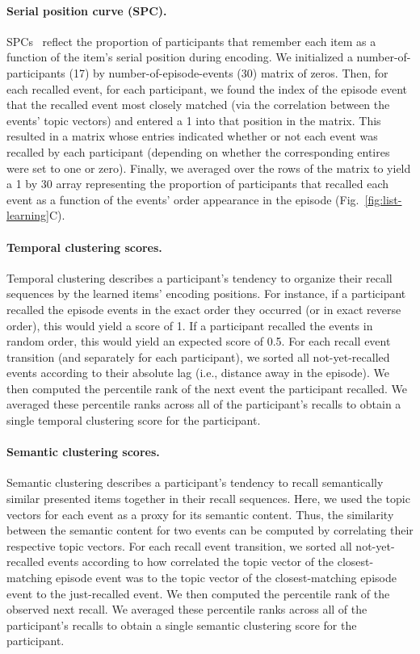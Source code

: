 \documentclass[10pt]{article}
\begin{document}
\paragraph{Serial position curve (SPC).} SPCs~\citep{Murd62a} reflect the proportion of participants that remember each item as a function of the item's serial position during encoding. We initialized a number-of-participants (17) by number-of-episode-events (30) matrix of zeros. Then, for each recalled event, for each participant, we found the index of the episode event that the recalled event most closely matched (via the correlation between the events' topic vectors) and entered a 1 into that position in the matrix. This resulted in a matrix whose entries indicated whether or not each event was recalled by each participant (depending on whether the corresponding entires were set to one or zero).  Finally, we averaged over the rows of the matrix to yield a 1 by 30 array representing the proportion of participants that recalled each event as a function of the events' order appearance in the episode (Fig.~\ref{fig:list-learning}C).

\paragraph{Temporal clustering scores.} Temporal clustering describes a participant's tendency to organize their recall sequences by the learned items' encoding positions.  For instance, if a participant recalled the episode events in the exact order they occurred (or in exact reverse order), this would yield a score of 1.  If a participant recalled the events in random order, this would yield an expected score of 0.5.  For each recall event transition (and separately for each participant), we sorted all not-yet-recalled events according to their absolute lag (i.e., distance away in the episode).  We then computed the percentile rank of the next event the participant recalled.  We averaged these percentile ranks across all of the participant's recalls to obtain a single temporal clustering score for the participant.

\paragraph{Semantic clustering scores.} Semantic clustering describes a participant's tendency to recall semantically similar presented items together in their recall sequences.  Here, we used the topic vectors for each event as a proxy for its semantic content. Thus, the similarity between the semantic content for two events can be computed by correlating their respective topic vectors.  For each recall event transition, we sorted all not-yet-recalled events according to how correlated the topic vector of the closest-matching episode event was to the topic vector of the closest-matching episode event to the just-recalled event.  We then computed the percentile rank of the observed next recall.  We averaged these percentile ranks across all of the participant's recalls to obtain a single semantic clustering score for the participant.
\end{document}
